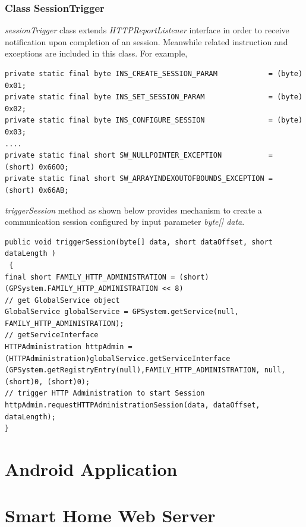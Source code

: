 \subsubsection{Class SessionTrigger}
\emph{sessionTrigger} class extends \emph{HTTPReportListener} interface in order to receive notification upon completion of an session. Meanwhile related instruction and exceptions are included in this class. For example,
\begin{Verbatim}[fontsize=\relsize{-1}]
private static final byte INS_CREATE_SESSION_PARAM            = (byte) 0x01;
private static final byte INS_SET_SESSION_PARAM               = (byte) 0x02;
private static final byte INS_CONFIGURE_SESSION               = (byte) 0x03;
....
private static final short SW_NULLPOINTER_EXCEPTION           = (short) 0x6600;
private static final short SW_ARRAYINDEXOUTOFBOUNDS_EXCEPTION = (short) 0x66AB;
\end{Verbatim}
\emph{triggerSession} method as shown below provides mechanism to create a communication session configured by input parameter \emph{byte[] data}.

\begin{Verbatim}[fontsize=\relsize{-1}, frame=lines,framesep=4mm, label=\fbox{\small\emph{Trigger Session}}]
public void triggerSession(byte[] data, short dataOffset, short dataLength )
 {
final short FAMILY_HTTP_ADMINISTRATION = (short) (GPSystem.FAMILY_HTTP_ADMINISTRATION << 8)
// get GlobalService object
GlobalService globalService = GPSystem.getService(null, FAMILY_HTTP_ADMINISTRATION);
// getServiceInterface
HTTPAdministration httpAdmin = (HTTPAdministration)globalService.getServiceInterface
(GPSystem.getRegistryEntry(null),FAMILY_HTTP_ADMINISTRATION, null, (short)0, (short)0);
// trigger HTTP Administration to start Session
httpAdmin.requestHTTPAdministrationSession(data, dataOffset, dataLength);
}
\end{Verbatim}

\section{Android Application}

\section{Smart Home Web Server}